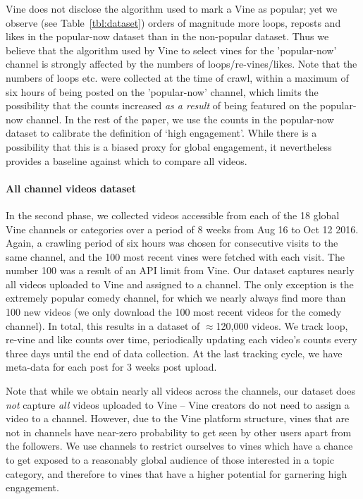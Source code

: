 Vine does not disclose the algorithm used to mark a Vine as popular; yet we observe (see Table~\ref{tbl:dataset}) orders of magnitude more loops, reposts and likes in the popular-now dataset than in the non-popular dataset. Thus we believe that the algorithm used by Vine to select vines for the 'popular-now' channel is strongly affected by the numbers of loops/re-vines/likes. Note that the numbers of loops etc. were collected at the time of crawl, within a maximum of six hours of being posted on the 'popular-now' channel, which limits the possibility that the counts increased \emph{as a result} of being featured on the popular-now channel. In the rest of the paper, we use the counts in the popular-now dataset to calibrate the definition of `high engagement'. While there is a possibility that this is a biased proxy for global engagement, it nevertheless provides a baseline against which to compare all videos.

\paragraph{All channel videos dataset} In the second phase, we collected 
videos accessible from each of the 18 global Vine channels or categories%
over a period of {8 weeks} from {Aug 16 to Oct 12  2016}. Again, a crawling period of six hours was chosen for consecutive visits to the same channel, and the 100 most recent vines were fetched with each visit. The number 100 was a result of an API limit from Vine. 
Our dataset captures nearly all videos uploaded to Vine and assigned to a channel. The only exception is the extremely popular comedy channel, for which we nearly always find more than 100 new videos (we only download the 100 most recent videos for the comedy channel). In total, this results in a dataset of $\approx$120,000 videos. We track  loop, re-vine and like counts  over time, periodically updating each video's counts every three days until the end of  data collection. At the last tracking cycle, we have meta-data for each post for  3 weeks post upload.

Note that while we obtain nearly all videos across the channels, our dataset does \emph{not} capture  \emph{all} videos uploaded to Vine -- Vine creators do not need to assign a video to a channel. However, due to the Vine platform structure,  vines that are not in channels have near-zero probability to get seen by other users apart from the followers. %
We use channels to restrict ourselves to vines which have a chance to get exposed to a reasonably global audience of those interested in a topic category, and therefore to vines that have a higher potential for garnering high engagement. 

